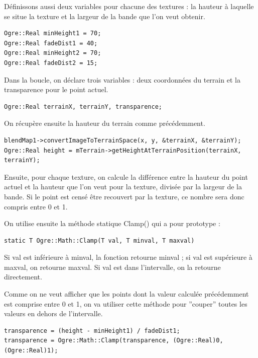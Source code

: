 D\'efinissons aussi deux variables pour chacune des textures : la hauteur \`a laquelle se situe la texture et la largeur de la bande que l'on veut obtenir.

\begin{lstlisting}[caption={}]
Ogre::Real minHeight1 = 70;
Ogre::Real fadeDist1 = 40;
Ogre::Real minHeight2 = 70;
Ogre::Real fadeDist2 = 15;
\end{lstlisting}

Dans la boucle, on d\'eclare trois variables : deux coordonn\'ees du terrain et la transparence pour le point actuel.

\begin{lstlisting}[caption={}]
Ogre::Real terrainX, terrainY, transparence;
\end{lstlisting}

On r\'ecup\`ere ensuite la hauteur du terrain comme pr\'ec\'edemment.

\begin{lstlisting}[caption={}]
blendMap1->convertImageToTerrainSpace(x, y, &terrainX, &terrainY);
Ogre::Real height = mTerrain->getHeightAtTerrainPosition(terrainX, terrainY);
\end{lstlisting}

Ensuite, pour chaque texture, on calcule la diff\'erence entre la hauteur du point actuel et la hauteur que l'on veut pour la texture, divis\'ee par la largeur de la bande. Si le point est cens\'e \^etre recouvert par la texture, ce nombre sera donc compris entre 0 et 1.

On utilise ensuite la m\'ethode statique Clamp() qui a pour prototype :

\begin{lstlisting}[caption={Utilisation de la m\'ethode statique Clamp()}]
static T Ogre::Math::Clamp(T val, T minval, T maxval)
\end{lstlisting}

Si val est inf\'erieure \`a minval, la fonction retourne minval ; si val est sup\'erieure \`a maxval, on retourne maxval. Si val est dans l'intervalle, on la retourne directement.

Comme on ne veut afficher que les points dont la valeur calcul\'ee pr\'ec\'edemment est comprise entre 0 et 1, on va utiliser cette m\'ethode pour ''couper'' toutes les valeurs en dehors de l'intervalle.

\begin{lstlisting}[caption={}]
transparence = (height - minHeight1) / fadeDist1;
transparence = Ogre::Math::Clamp(transparence, (Ogre::Real)0, (Ogre::Real)1);
\end{lstlisting}

